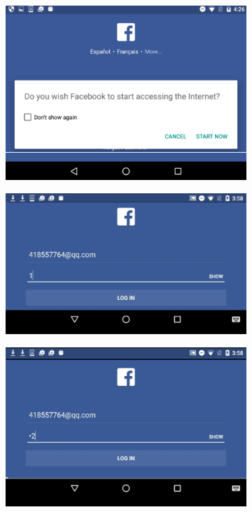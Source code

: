 \documentclass[letterpaper,12pt]{article}
\begin{document}
\begin{figure}[t]
        \centering
        \begin{subfigure}[b]{0.285\textwidth}
                \centering
               \includegraphics[width=\linewidth]{5-1}
                \caption{}
        \end{subfigure}
        \begin{subfigure}[b]{0.35\textwidth}
                \centering
          \includegraphics[width=\linewidth]{5-2}
                \caption{}
        \end{subfigure}
        \begin{subfigure}[b]{0.31\textwidth}
                \centering
          \includegraphics[width=\linewidth]{5-3}

\end{subfigure}
\end{figure}
\end{document}
